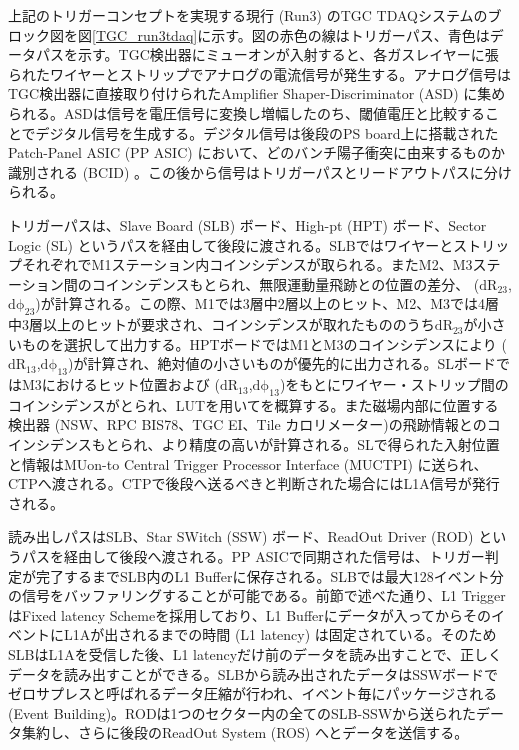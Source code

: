 上記のトリガーコンセプトを実現する現行 (Run3) のTGC TDAQシステムのブロック図を図\ref{TGC_run3tdaq}に示す。図の赤色の線はトリガーパス、青色はデータパスを示す。TGC検出器にミューオンが入射すると、各ガスレイヤーに張られたワイヤーとストリップでアナログの電流信号が発生する。アナログ信号はTGC検出器に直接取り付けられたAmplifier Shaper-Discriminator  (ASD) に集められる。ASDは信号を電圧信号に変換し増幅したのち、閾値電圧と比較することでデジタル信号を生成する。デジタル信号は後段のPS board上に搭載されたPatch-Panel ASIC  (PP ASIC) において、どのバンチ陽子衝突に由来するものか識別される  (BCID) 。この後から信号はトリガーパスとリードアウトパスに分けられる。

トリガーパスは、Slave Board  (SLB) ボード、High-pt  (HPT) ボード、Sector Logic  (SL) というパスを経由して後段に渡される。SLBではワイヤーとストリップそれぞれでM1ステーション内コインシデンスが取られる。またM2、M3ステーション間のコインシデンスもとられ、無限運動量飛跡との位置の差分、 ($\mathrm{dR_{23}}$,$\mathrm{d\phi_{23}}$)が計算される。この際、M1では3層中2層以上のヒット、M2、M3では4層中3層以上のヒットが要求され、コインシデンスが取れたもののうち$\mathrm{dR_{23}}$が小さいものを選択して出力する。HPTボードではM1とM3のコインシデンスにより ($\mathrm{dR_{13}}$,$\mathrm{d\phi_{13}}$)が計算され、絶対値の小さいものが優先的に出力される。SLボードではM3におけるヒット位置および ($\mathrm{dR_{13}}$,$\mathrm{d\phi_{13}}$)をもとにワイヤー・ストリップ間のコインシデンスがとられ、LUTを用いて\pt を概算する。また磁場内部に位置する検出器 (NSW、RPC BIS78、TGC EI、Tile カロリメーター)の飛跡情報とのコインシデンスもとられ、より精度の高い\pt が計算される。SLで得られた入射位置と\pt 情報はMUon-to Central Trigger Processor Interface  (MUCTPI) に送られ、CTPへ渡される。CTPで後段へ送るべきと判断された場合にはL1A信号が発行される。

読み出しパスはSLB、Star SWitch  (SSW) ボード、ReadOut Driver  (ROD) というパスを経由して後段へ渡される。PP ASICで同期された信号は、トリガー判定が完了するまでSLB内のL1 Bufferに保存される。SLBでは最大128イベント分の信号をバッファリングすることが可能である。前節で述べた通り、L1 TriggerはFixed latency Schemeを採用しており、L1 Bufferにデータが入ってからそのイベントにL1Aが出されるまでの時間  (L1 latency) は固定されている。そのためSLBはL1Aを受信した後、L1 latencyだけ前のデータを読み出すことで、正しくデータを読み出すことができる。SLBから読み出されたデータはSSWボードでゼロサプレスと呼ばれるデータ圧縮が行われ、イベント毎にパッケージされる  (Event Building)。RODは1つのセクター内の全てのSLB-SSWから送られたデータ集約し、さらに後段のReadOut System  (ROS) へとデータを送信する。

